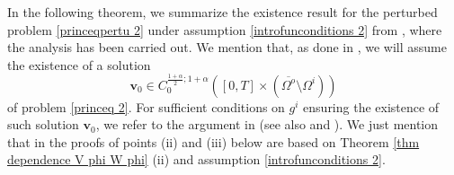 \documentclass[11pt,reqno,a4paper]{amsart}
\theoremstyle{plain}
\theoremstyle{definition}
\begin{document}
In the following theorem, we summarize the existence result for the perturbed problem \eqref{princeqpertu 2} under assumption \eqref{introfunconditions 2} from \cite[Sect.\,3]{DaLuMoMu24.2}, where the analysis has been carried out. We mention that, as done in \cite{DaLuMoMu24.2}, we will assume the existence of a solution 
\[
\mathbf{v}_0 \in C_{0}^{\frac{1+\alpha}{2}; 1+\alpha}([0,T] \times (\overline{\Omega^o} \setminus \Omega^i))
\]
of problem \eqref{princeq 2}. For sufficient conditions on $g^i$ ensuring the existence of such solution $\mathbf{v}_0$, we refer to the argument in \cite{DaMoMu19} (see also \cite{Mo24} and \cite{Friedman2008}). We just mention that in \cite{DaLuMoMu24.2} the proofs of points (ii) and (iii) below are based on Theorem \ref{thm dependence V phi W phi} (ii) and assumption \eqref{introfunconditions 2}.
\end{document}
